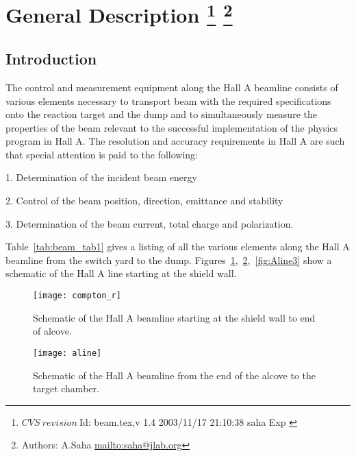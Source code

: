 \section[General Description]{General Description
\footnote{
  $CVS~revision~ $Id: beam.tex,v 1.4 2003/11/17 21:10:38 saha Exp $ $
}
\footnote{Authors: A.Saha \url{mailto:saha@jlab.org}}
}
\subsection{Introduction}

The control and measurement equipment along the Hall A beamline consists of 
various elements necessary to transport beam with the required specifications 
onto the reaction target and the dump and to simultaneously measure the 
properties of the beam relevant to the successful implementation of the 
physics program in Hall A.  The resolution and accuracy requirements in Hall 
A are such that special attention is paid to the following:

\vskip 0.5cm

1. Determination of the incident beam energy

2. Control of the beam position, direction, emittance and stability

3. Determination of the beam current, total charge and polarization.

\vskip 0.5cm
Table~\ref{tab:beam_tab1} gives a listing of all the various elements
along the Hall A beamline from the switch yard to the dump.
Figures~\ref{fig:Aline1},~\ref{fig:Aline2},~\ref{fig:Aline3} show
a schematic of the Hall A line starting at the shield wall.

\begin{figure}
\begin{center}
\texttt{[image: compton\_r]}
{\linespread{1.}
\caption[Beamline: Hall A Beamline Overview]{Schematic of the Hall A beamline
starting at the shield wall to end of alcove.}
\label{fig:Aline1}}
\end{center}
\end{figure}

\begin{figure}
\begin{center}
\texttt{[image: aline]}
{\linespread{1.}
\caption[Beamline: Hall A Beamline Overview]{Schematic of the Hall A beamline
from the end of the alcove to the target chamber.}
\label{fig:Aline2}}
\end{center}
\end{figure}

